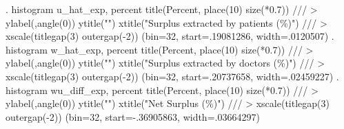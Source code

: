 . histogram u_hat_exp, percent title(Percent, place(10) size(*0.7))               ///
>            ylabel(,angle(0)) ytitle("") xtitle("Surplus extracted by patients (\%)") ///
>            xscale(titlegap(3) outergap(-2))
(bin=32, start=.19081286, width=.0120507)
{\smallskip}
. histogram w_hat_exp, percent title(Percent, place(10) size(*0.7))               ///
>            ylabel(,angle(0)) ytitle("") xtitle("Surplus extracted by doctors (\%)")  ///
>            xscale(titlegap(3) outergap(-2))
(bin=32, start=.20737658, width=.02459227)
{\smallskip}
. histogram wu_diff_exp, percent title(Percent, place(10) size(*0.7))             ///
>            ylabel(,angle(0)) ytitle("") xtitle("Net Surplus (\%)")                   ///
>            xscale(titlegap(3) outergap(-2))
(bin=32, start=-.36905863, width=.03664297)
